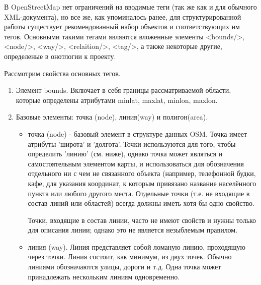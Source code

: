 \documentclass[12pt,a4paper,oneside]{article} %
\begin{document}
В OpenStreetMap нет ограничений на вводимые теги (так же как \linebreak
и для обычного XML-документа), но все же, как упоминалось ранее, для \linebreak
структурированной работы существует рекомендованный набор объектов и \linebreak
соответствующих им тегов. Основными такими тегами являются вложенные \linebreak
элементы <bounds/>, <node/>, <way/>, <relaition/>, <tag/>, а также \linebreak
некоторые другие, определеные в онотлогии к проекту.

Рассмотрим свойства основных тегов.

\begin{enumerate}
\item Элемент bounds. Включает в себя границы рассматриваемой области, \linebreak
которые определены атрибутами minlat, maxlat, minlon, maxlon.
\item Базовые элементы: точка (node), линия(way) и полигон(area).
\begin{itemize}
\item точка (node) - базовый элемент в структуре данных OSM. Точка \linebreak
имеет атрибуты 'широта' и 'долгота'. Точки используются для того, \linebreak
чтобы определить 'линию' (см. ниже), однако точка может являться\linebreak
и самостоятельным элементом карты, и использоваться для \linebreak
обозначения отдельного ни с чем не связанного объекта (например, \linebreak
телефонной будки, кафе, для указания координат, к которым \linebreak
привязано название населённого пункта или любого другого места. \linebreak
Отдельные точки (т.е. не входящие в состав линий или областей) \linebreak
всегда должны иметь хотя бы одно свойство.

Точки, входящие в состав линии, часто не имеют свойств и нужны \linebreak
только для описания линии; однако это не является незыблемым правилом.


\item линия (way). Линия представляет собой ломаную линию, \linebreak
проходящую через точки. Линия состоит, как минимум, из двух \linebreak
точек. Обычно линиями обозначаются улицы, дороги и т.д. Одна \linebreak
точка может принадлежать нескольким линиям одновременно.


\end{itemize}
\end{enumerate}
\end{document}
